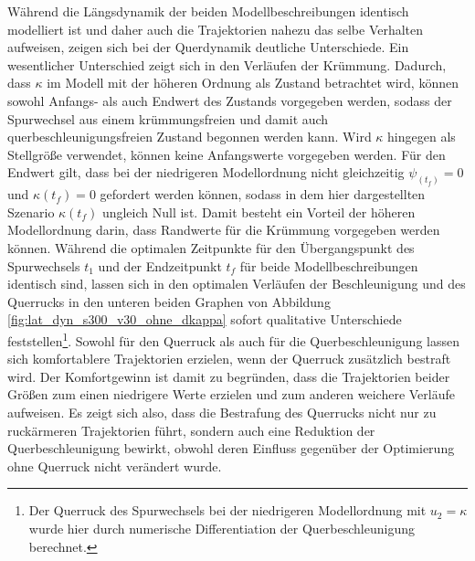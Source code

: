 Während die Längsdynamik der beiden Modellbeschreibungen identisch modelliert ist und daher auch die Trajektorien nahezu das selbe Verhalten aufweisen, zeigen sich bei der Querdynamik deutliche Unterschiede. Ein wesentlicher Unterschied zeigt sich in den Verläufen der Krümmung. Dadurch, dass $\kappa$ im Modell mit der höheren Ordnung als Zustand betrachtet wird, können sowohl Anfangs- als auch Endwert des Zustands vorgegeben werden, sodass der Spurwechsel aus einem krümmungsfreien und damit auch querbeschleunigungsfreien Zustand begonnen werden kann. Wird $\kappa$ hingegen als Stellgröße verwendet, können keine Anfangswerte vorgegeben werden. Für den Endwert gilt, dass bei der niedrigeren Modellordnung nicht gleichzeitig $\psi_(t_f) = 0$ und $\kappa(t_f) = 0$ gefordert werden können, sodass in dem hier dargestellten Szenario $\kappa(t_f)$ ungleich Null ist. Damit besteht ein Vorteil der höheren Modellordnung darin, dass Randwerte für die Krümmung vorgegeben werden können. Während die optimalen Zeitpunkte für den Übergangspunkt des Spurwechsels $t_1$ und der Endzeitpunkt $t_f$ für beide Modellbeschreibungen identisch sind, lassen sich in den optimalen Verläufen der Beschleunigung und des Querrucks in den unteren beiden Graphen von Abbildung \ref{fig:lat_dyn_s300_v30_ohne_dkappa} sofort qualitative Unterschiede feststellen\footnote{Der Querruck des Spurwechsels bei der niedrigeren Modellordnung mit $u_2 = \kappa$ wurde hier durch numerische Differentiation der Querbeschleunigung berechnet.}. Sowohl für den Querruck als auch für die Querbeschleunigung lassen sich komfortablere Trajektorien erzielen, wenn der Querruck zusätzlich bestraft wird. Der Komfortgewinn ist damit zu begründen, dass die Trajektorien beider Größen zum einen niedrigere Werte erzielen und zum anderen weichere Verläufe aufweisen. Es zeigt sich also, dass die Bestrafung des Querrucks nicht nur zu ruckärmeren Trajektorien führt, sondern auch eine Reduktion der Querbeschleunigung bewirkt, obwohl deren Einfluss gegenüber der Optimierung ohne Querruck nicht verändert wurde.

